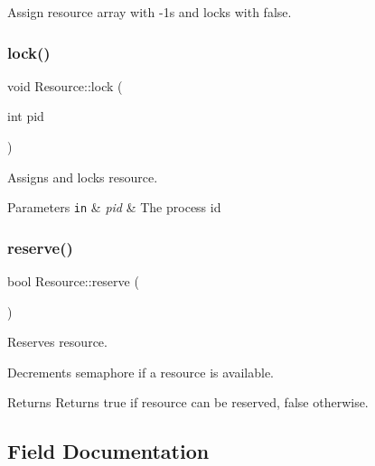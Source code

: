 Assign resource array with -\/1\textquotesingle{}s and locks with false. \hypertarget{class_resource_abbe4d6d7e9ee1fb34f53aede34acfdf4}{}\label{class_resource_abbe4d6d7e9ee1fb34f53aede34acfdf4} 
\subsubsection{\texorpdfstring{lock()}{lock()}}
{\footnotesize\ttfamily void Resource\+::lock (\begin{DoxyParamCaption}\item[{int}]{pid }\end{DoxyParamCaption})}



Assigns and locks resource. 


\begin{DoxyParams}[1]{Parameters}
\mbox{\tt in}  & {\em pid} & The process id \\
\hline
\end{DoxyParams}
\hypertarget{class_resource_a269d0bd21401f93304f9b65837259444}{}\label{class_resource_a269d0bd21401f93304f9b65837259444} 
\subsubsection{\texorpdfstring{reserve()}{reserve()}}
{\footnotesize\ttfamily bool Resource\+::reserve (\begin{DoxyParamCaption}{ }\end{DoxyParamCaption})}



Reserves resource. 

Decrements semaphore if a resource is available.

\begin{DoxyReturn}{Returns}
Returns true if resource can be reserved, false otherwise. 
\end{DoxyReturn}


\subsection{Field Documentation}
\hypertarget{class_resource_a79fa88cc3a0abd81a39d5bcb159ccda3}{}\label{class_resource_a79fa88cc3a0abd81a39d5bcb159ccda3} 
